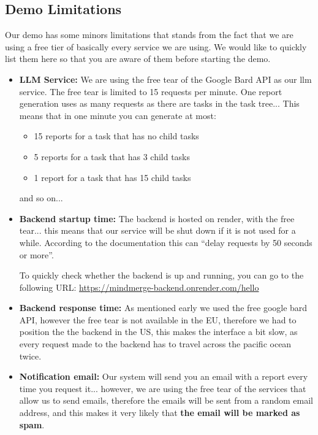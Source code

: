 \documentclass{article}
\begin{document}
\subsection{Demo Limitations}

Our demo has some minors limitations that stands from the fact that we are using a free tier of basically every service we are using.
We would like to quickly list them here so that you are aware of them before starting the demo.

\begin{itemize}
  \item \textbf{LLM Service:} We are using the free tear of the Google Bard API as our llm service. The free tear is limited to 15 requests per minute.
        One report generation uses as many requests as there are tasks in the task tree... This means that in one minute you can generate at most:
        \begin{itemize}
          \item 15 reports for a task that has no child tasks
          \item 5 reports for a task that has 3 child tasks
          \item 1 report for a task that has 15 child tasks
        \end{itemize}
        and so on...
  \item \textbf{Backend startup time:} The backend is hosted on render, with the free tear... this means that our service will be 
        shut down if it is not used for a while. According to the documentation this can ``delay requests by 50 seconds or more''.

        To quickly check whether the backend is up and running, you can go to the following URL: \url{https://mindmerge-backend.onrender.com/hello}
  \item \textbf{Backend response time:} As mentioned early we used the free google bard API, however the free tear is not available in the EU, therefore we
  had to position the the backend in the US, this makes the interface a bit slow, as every request made to the backend has to travel across the pacific ocean twice.

  \item \textbf{Notification email:} Our system will send you an email with a report every time you request it... however, we are using the free tear of the 
  services that allow us to send emails, therefore the emails will be sent from a random email address, and this makes it very likely that \textbf{the email will be marked as spam}.
\end{itemize}
\end{document}
